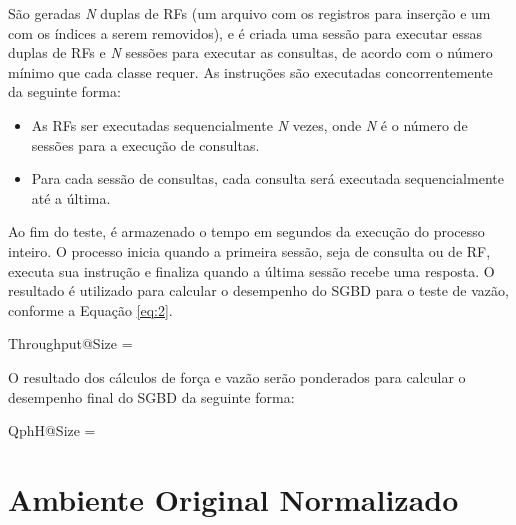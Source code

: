São geradas \textit{N} duplas de RFs (um arquivo com os registros para inserção e um com os índices a serem removidos), e é criada uma sessão para executar essas duplas de RFs e \textit{N} sessões para executar as consultas, de acordo com o número mínimo que cada classe requer. As instruções são executadas concorrentemente da seguinte forma:

\begin{itemize}
	\item As RFs ser executadas sequencialmente \textit{N} vezes, onde \textit{N} é o número de sessões para a execução de consultas.
	\item Para cada sessão de consultas, cada consulta será executada sequencialmente até a última.
\end{itemize}

Ao fim do teste, é armazenado o tempo em segundos da execução do processo inteiro. O processo inicia quando a primeira sessão, seja de consulta ou de RF, executa sua instrução e finaliza quando a última sessão recebe uma resposta. O resultado é utilizado para calcular o desempenho do SGBD para o teste de vazão, conforme a Equação \ref{eq:2}.

\begin{myequation}%
\label{eq:2}
{\scriptstyle Throughput@Size} =  %
\end{myequation}
%

O resultado dos cálculos de força e vazão serão ponderados para calcular o desempenho final do SGBD da seguinte forma:

\begin{myequation}%
\label{eq:3}
{ \scriptstyle QphH@Size =  } %
\end{myequation}
%

\section{Ambiente Original Normalizado}
\label{ambiente_1}

